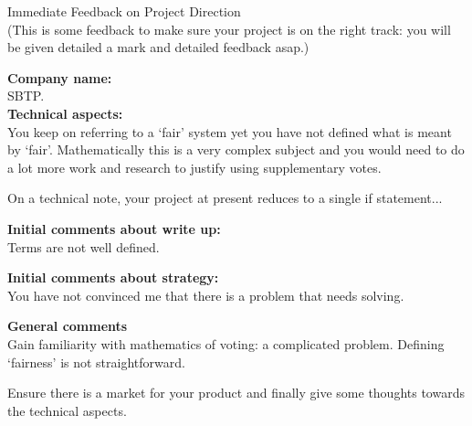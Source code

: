 \documentclass{article}
\begin{document}
\begin{center}
\Huge{Immediate Feedback on Project Direction}\\
\tiny{(This is some feedback to make sure your project is on the right track: you will be given detailed a mark and detailed feedback asap.)}
\end{center}


\normalsize
\textbf{Company name:}\\

SBTP. \\

\textbf{Technical aspects:}\\

You keep on referring to a `fair' system yet you have not defined what is meant by `fair'.
Mathematically this is a very complex subject and you would need to do a lot more work and research to justify using supplementary votes.

On a technical note, your project at present reduces to a single if statement...

\textbf{Initial comments about write up:}\\

Terms are not well defined.

\textbf{Initial comments about strategy:}\\

You have not convinced me that there is a problem that needs solving.

\textbf{General comments}\\

Gain familiarity with mathematics of voting: a complicated problem.
Defining `fairness' is not straightforward.

Ensure there is a market for your product and finally give some thoughts towards the technical aspects.
\end{document}
